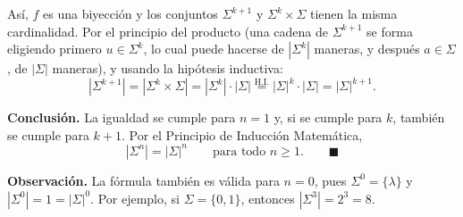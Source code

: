 Así, $f$ es una biyección y los conjuntos $\Sigma^{k+1}$ y $\Sigma^k \times \Sigma$
tienen la misma cardinalidad. Por el principio del producto
(una cadena de $\Sigma^{k+1}$ se forma eligiendo primero $u \in \Sigma^k$, lo cual
puede hacerse de $|\Sigma^k|$ maneras, y después $a \in \Sigma$, de $|\Sigma|$
maneras), y usando la hipótesis inductiva:
\[
|\Sigma^{k+1}|
= |\Sigma^k \times \Sigma|
= |\Sigma^k| \cdot |\Sigma|
\overset{\text{H.I.}}{=} |\Sigma|^k \cdot |\Sigma|
= |\Sigma|^{k+1} .
\]

\medskip
\noindent\textbf{Conclusión.} La igualdad se cumple para $n = 1$ y, si se cumple
para $k$, también se cumple para $k+1$. Por el Principio de Inducción Matemática,
\[
|\Sigma^n| = |\Sigma|^n \qquad \text{para todo } n \geq 1. \qquad \blacksquare
\]

\medskip
\noindent\textbf{Observación.} La fórmula también es válida para $n = 0$, pues
$\Sigma^0 = \{\lambda\}$ y $|\Sigma^0| = 1 = |\Sigma|^0$. Por ejemplo, si
$\Sigma = \{0, 1\}$, entonces $|\Sigma^3| = 2^3 = 8$.